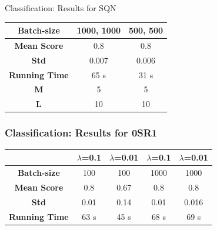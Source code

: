 \documentclass[10pt]{beamer}
\begin{document}

  
    	\begin{frame}{Classification: Results for SQN}
    		\begin{center}
    		\begin{tabular}{c|c|c}
    			
    			
    			\textbf{Batch-size} &  1000, 1000 &  500, 500 \\  \hline
    			\textbf{ Mean Score} &   0.8	&  0.8  \\	\hline  
    			\textbf{ Std} &  0.007 &  0.006 \\ \hline
    			\textbf{ Running Time} &  65 s &  31 s  \\ \hline 
    			\textbf{ M} &  5 &  5  \\ \hline
    			\textbf{ L} &  10 &  10  \\ 
    			
    		\end{tabular}
    \end{center}
    \end{frame}
    \begin{frame}\frametitle{Classification: Results for 0SR1}
    	\begin{center}
    		\begin{tabular}{c|c|c||c|c}
    			
    			&\textbf{ $\lambda$=0.1 } &\textbf{  $\lambda$=0.01}&\textbf{ $\lambda$=0.1 } &\textbf{ $\lambda$=0.01} \\ \hline
    			\textbf{Batch-size} & 100 &  100&  1000 &  1000\\  \hline
    			\textbf{ Mean Score} &   0.8	&  0.67 & 0.8 & 0.8\\	\hline  
    			\textbf{ Std} &  0.01 &  0.14 &  0.01& 0.016\\ \hline
    			\textbf{ Running Time} &  63 s &  45 s & 68 s& 69 s \\ 
    			
    		\end{tabular}
    	\end{center}
    \end{frame}
\end{document}
